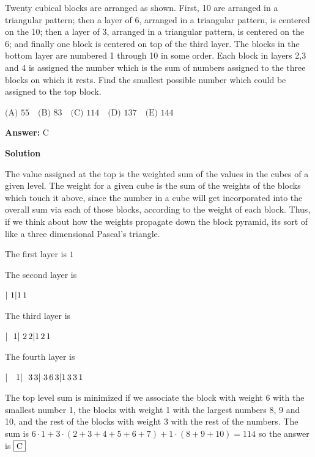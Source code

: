 \begin{enumerate}
 Twenty cubical blocks are arranged as shown. First, 10 are arranged in a triangular pattern; then a layer of 6, arranged in a triangular pattern, is centered on the 10; then a layer of 3, arranged in a triangular pattern, is centered on the 6; and finally one block is centered on top of the third layer. The blocks in the bottom layer are numbered 1 through 10 in some order. Each block in layers 2,3 and 4 is assigned the number which is the sum of numbers assigned to the three blocks on which it rests. Find the smallest possible number which could be assigned to the top block.


 $\text{(A) } 55\quad \text{(B) } 83\quad \text{(C) } 114\quad \text{(D) } 137\quad \text{(E) } 144$

 \textbf{Answer: }C



\textbf{Solution}

The value assigned at the top is the weighted sum of the values in the cubes of a given level.  The weight for a given cube is the sum of the weights of the blocks which touch it above, since the number in a cube will get incorporated into the overall sum via each of those blocks, according to the weight of each block.  Thus, if we think about how the weights propagate down the block pyramid, its sort of like a three dimensional Pascal's triangle.

 The first layer is $1$

 The second layer is 

 $| \, \, 1 \\ |1 \, 1$

 The third layer is 

 $| \,\,\,\, 1 \\| \,\, 2 \, 2 \\| 1 \,2 \, 1$

 The fourth layer is 

 $| \,\,\,\,\,\, 1 \\| \,\,\,\, 3 \, 3 \\| \,\, 3 \,6 \, 3 \\| 1\, 3\, 3\, 1$

 The top level sum is minimized if we associate the block with weight 6 with the smallest number 1, the blocks with weight 1 with the largest numbers 8, 9 and 10, and the rest of the blocks with weight 3 with the rest of the numbers.  The sum is $6\cdot 1 + 3 \cdot (2+3+4+5+6+7 ) + 1\cdot (8+9+10) = 114$ so the answer is  $\fbox{C}$




\end{enumerate}
